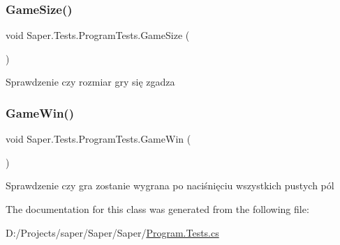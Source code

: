 \subsubsection{\texorpdfstring{GameSize()}{GameSize()}}
{\footnotesize\ttfamily void Saper.\+Tests.\+Program\+Tests.\+Game\+Size (\begin{DoxyParamCaption}{ }\end{DoxyParamCaption})}

Sprawdzenie czy rozmiar gry się zgadza \mbox{\label{class_saper_1_1_tests_1_1_program_tests_a9a2abea95633c70b2845c44e017399cb}} 
\subsubsection{\texorpdfstring{GameWin()}{GameWin()}}
{\footnotesize\ttfamily void Saper.\+Tests.\+Program\+Tests.\+Game\+Win (\begin{DoxyParamCaption}{ }\end{DoxyParamCaption})}

Sprawdzenie czy gra zostanie wygrana po naciśnięciu wszystkich pustych pól 

The documentation for this class was generated from the following file\+:\begin{DoxyCompactItemize}
\item 
D\+:/\+Projects/saper/\+Saper/\+Saper/\mbox{\hyperlink{_program_8_tests_8cs}{Program.\+Tests.\+cs}}\end{DoxyCompactItemize}
